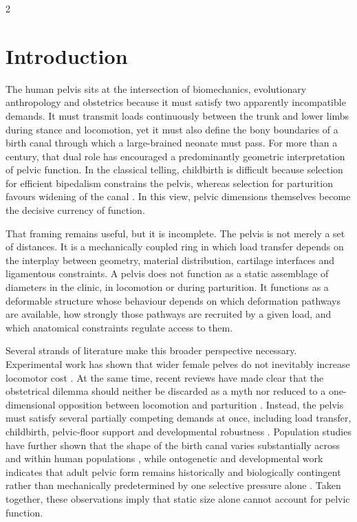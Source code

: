 \documentclass[openacc]{rsproca_new}
\begin{document}
\begin{multicols}{2}

\section{Introduction}

The human pelvis sits at the intersection of biomechanics, evolutionary anthropology and obstetrics because it must satisfy two apparently incompatible demands. It must transmit loads continuously between the trunk and lower limbs during stance and locomotion, yet it must also define the bony boundaries of a birth canal through which a large-brained neonate must pass. For more than a century, that dual role has encouraged a predominantly geometric interpretation of pelvic function. In the classical telling, childbirth is difficult because selection for efficient bipedalism constrains the pelvis, whereas selection for parturition favours widening of the canal \cite{RosenbergTrevathan2002,Trevathan2015,Grunstra2023}. In this view, pelvic dimensions themselves become the decisive currency of function.

That framing remains useful, but it is incomplete. The pelvis is not merely a set of distances. It is a mechanically coupled ring in which load transfer depends on the interplay between geometry, material distribution, cartilage interfaces and ligamentous constraints. A pelvis does not function as a static assemblage of diameters in the clinic, in locomotion or during parturition. It functions as a deformable structure whose behaviour depends on which deformation pathways are available, how strongly those pathways are recruited by a given load, and which anatomical constraints regulate access to them.

Several strands of literature make this broader perspective necessary. Experimental work has shown that wider female pelves do not inevitably increase locomotor cost \cite{Warrener2015}. At the same time, recent reviews have made clear that the obstetrical dilemma should neither be discarded as a myth nor reduced to a one-dimensional opposition between locomotion and parturition \cite{Pavlicev2020,Haeusler2021,Grunstra2023}. Instead, the pelvis must satisfy several partially competing demands at once, including load transfer, childbirth, pelvic-floor support and developmental robustness \cite{Grunstra2019,Haeusler2021}. Population studies have further shown that the shape of the birth canal varies substantially across and within human populations \cite{BettiManica2018,Auerbach2018}, while ontogenetic and developmental work indicates that adult pelvic form remains historically and biologically contingent rather than mechanically predetermined by one selective pressure alone \cite{VerbruggenNowlan2017,Novak2020,KurkiDecrausaz2015}. Taken together, these observations imply that static size alone cannot account for pelvic function.


\end{multicols}
\end{document}
